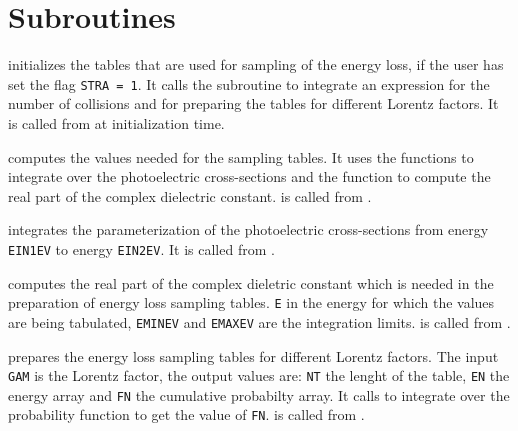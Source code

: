 
\section{Subroutines}

 initializes the tables that are used for sampling of
the energy loss, if the user has set the flag {\tt STRA = 1}.
It calls the subroutine  to integrate
an expression for the number of collisions and 
for preparing the tables for different Lorentz factors.
It is called from  at initialization time.

 computes the values needed for the sampling tables.
It uses the functions  to integrate over the
photoelectric cross-sections and the function 
to compute the real part of the complex dielectric constant.
 is called from .

 integrates the parameterization of the photoelectric
cross-sections from energy {\tt EIN1EV} to energy {\tt EIN2EV}.
It is called from .

 computes the real part of the complex dieletric
constant which is needed in the preparation of energy loss
sampling tables. {\tt E} in the energy for which the values
are being tabulated, {\tt EMINEV} and {\tt EMAXEV} are
the integration limits.  is called from
.

 prepares the energy loss sampling tables for
different Lorentz factors. The input {\tt GAM} is the Lorentz factor,
the output values are: {\tt NT} the lenght of the table,
{\tt EN} the energy array and {\tt FN} the cumulative probabilty array.
It calls  to integrate over the probability
function  to
get the value of {\tt FN}.  is called from
.

